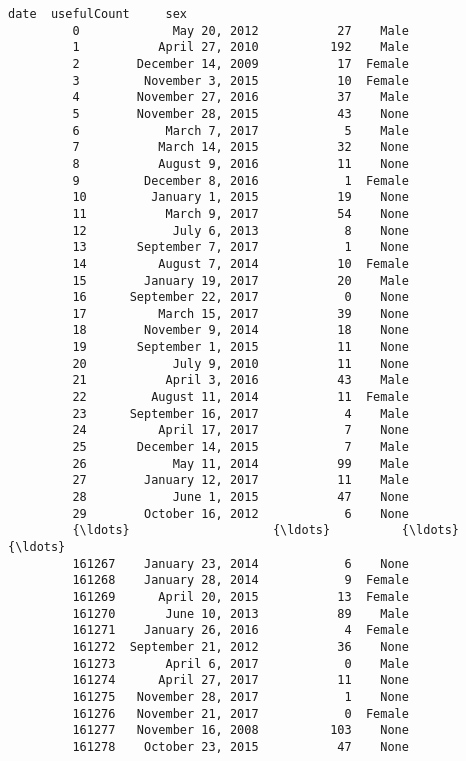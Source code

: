 \documentclass[11pt]{article}
\begin{document}
\begin{Verbatim}[commandchars=\\\{\}]
                               date  usefulCount     sex  
         0             May 20, 2012           27    Male  
         1           April 27, 2010          192    Male  
         2        December 14, 2009           17  Female  
         3         November 3, 2015           10  Female  
         4        November 27, 2016           37    Male  
         5        November 28, 2015           43    None  
         6            March 7, 2017            5    Male  
         7           March 14, 2015           32    None  
         8           August 9, 2016           11    None  
         9         December 8, 2016            1  Female  
         10         January 1, 2015           19    None  
         11           March 9, 2017           54    None  
         12            July 6, 2013            8    None  
         13       September 7, 2017            1    None  
         14          August 7, 2014           10  Female  
         15        January 19, 2017           20    Male  
         16      September 22, 2017            0    None  
         17          March 15, 2017           39    None  
         18        November 9, 2014           18    None  
         19       September 1, 2015           11    None  
         20            July 9, 2010           11    None  
         21           April 3, 2016           43    Male  
         22         August 11, 2014           11  Female  
         23      September 16, 2017            4    Male  
         24          April 17, 2017            7    None  
         25       December 14, 2015            7    Male  
         26            May 11, 2014           99    Male  
         27        January 12, 2017           11    Male  
         28            June 1, 2015           47    None  
         29        October 16, 2012            6    None  
         {\ldots}                    {\ldots}          {\ldots}     {\ldots}  
         161267    January 23, 2014            6    None  
         161268    January 28, 2014            9  Female  
         161269      April 20, 2015           13  Female  
         161270       June 10, 2013           89    Male  
         161271    January 26, 2016            4  Female  
         161272  September 21, 2012           36    None  
         161273       April 6, 2017            0    Male  
         161274      April 27, 2017           11    None  
         161275   November 28, 2017            1    None  
         161276   November 21, 2017            0  Female  
         161277   November 16, 2008          103    None  
         161278    October 23, 2015           47    None  

\end{Verbatim}
\end{document}
